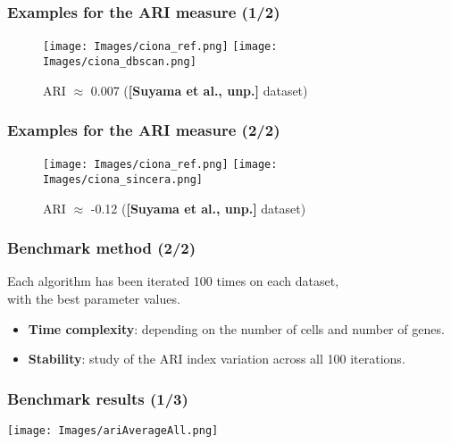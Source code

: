 \documentclass{beamer}
\begin{document}
\begin{frame}
\frametitle{Examples for the ARI measure (1/2)}

\begin{figure}
\subfigure\texttt{[image: Images/ciona\_ref.png]}
\subfigure\texttt{[image: Images/ciona\_dbscan.png]}
\caption{ARI $\approx$ 0.007 (\textbf{[Suyama et al., unp.]} dataset)}
\end{figure}

\end{frame}

\begin{frame}
\frametitle{Examples for the ARI measure (2/2)}

\begin{figure}
\subfigure\texttt{[image: Images/ciona\_ref.png]}
\subfigure\texttt{[image: Images/ciona\_sincera.png]}
\caption{ARI $\approx$ -0.12 (\textbf{[Suyama et al., unp.]} dataset)}
\end{figure}

\end{frame}

\begin{frame}
\frametitle{Benchmark method (2/2)}

\begin{alertblock}{}
\begin{flushcenter}
Each algorithm has been iterated 100 times on each dataset,\\ with the best parameter values.
\end{flushcenter}
\end{alertblock}

\bigskip

\begin{itemize}
\item \textbf{Time complexity}: depending on the number of cells and number of genes.

\bigskip

\item \textbf{Stability}: study of the ARI index variation across all 100 iterations.
\end{itemize}

\end{frame}

\begin{frame}
\frametitle{Benchmark results (1/3)}

\begin{center}
\texttt{[image: Images/ariAverageAll.png]}
\end{center}

\end{frame}
\end{document}
